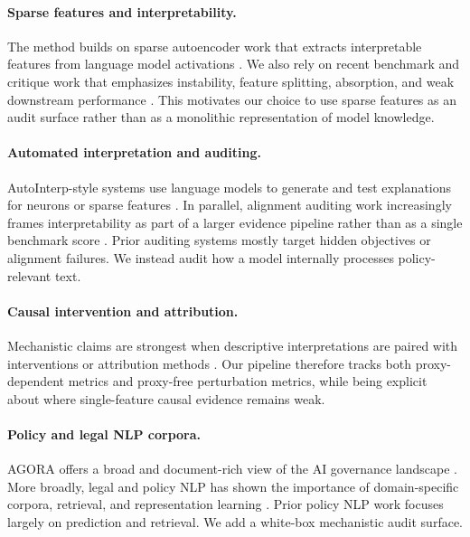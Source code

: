 \documentclass{article}
\begin{document}
\paragraph{Sparse features and interpretability.}
The method builds on sparse autoencoder work that extracts interpretable features from language model activations \cite{bricken2023monosemanticity, templeton2024scaling, cunningham2024sae, lieberum2024gemmascope}. We also rely on recent benchmark and critique work that emphasizes instability, feature splitting, absorption, and weak downstream performance \cite{karvonen2025saebench, chanin2024absorption, paulo2025differentfeatures, smith2024strongfeature, deepmindsafety2025negative, sharkey2025openproblems}. This motivates our choice to use sparse features as an audit surface rather than as a monolithic representation of model knowledge.

\paragraph{Automated interpretation and auditing.}
AutoInterp-style systems use language models to generate and test explanations for neurons or sparse features \cite{bills2023neurons, paulo2025autointerp, eleuther2024autointerp}. In parallel, alignment auditing work increasingly frames interpretability as part of a larger evidence pipeline rather than as a single benchmark score \cite{sheshadri2026auditbench, bricken2025auditingagents, marks2025hiddenobjectives, fronsdal2025petri}. Prior auditing systems mostly target hidden objectives or alignment failures. We instead audit how a model internally processes policy-relevant text.

\paragraph{Causal intervention and attribution.}
Mechanistic claims are strongest when descriptive interpretations are paired with interventions or attribution methods \cite{vig2020causal, meng2022rome, geiger2025causalabstraction, sundararajan2017integrated, marks2025sparsecircuits, belrose2023tunedlens}. Our pipeline therefore tracks both proxy-dependent metrics and proxy-free perturbation metrics, while being explicit about where single-feature causal evidence remains weak.

\paragraph{Policy and legal NLP corpora.}
AGORA offers a broad and document-rich view of the AI governance landscape \cite{arnold2024agora}. More broadly, legal and policy NLP has shown the importance of domain-specific corpora, retrieval, and representation learning \cite{chalkidis2020legalbert}. Prior policy NLP work focuses largely on prediction and retrieval. We add a white-box mechanistic audit surface.
\end{document}
